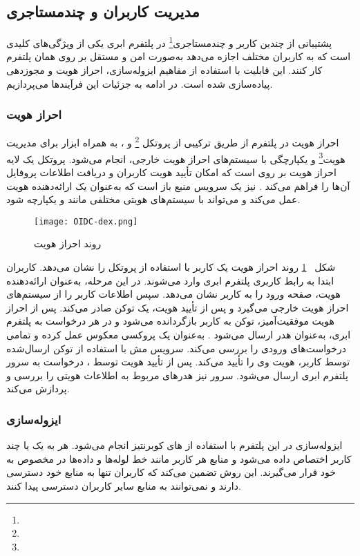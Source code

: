 \subsection{مدیریت کاربران و چندمستاجری}
پشتیبانی از چندین کاربر و چندمستاجری\footnote{} در پلتفرم ابری یکی از ویژگی‌های کلیدی است که به کاربران مختلف اجازه می‌دهد به‌صورت امن و مستقل بر روی همان پلتفرم کار کنند. این قابلیت با استفاده از مفاهیم ایزوله‌سازی، احراز هویت و مجوزدهی پیاده‌سازی شده است. در ادامه به جزئیات این فرآیندها می‌پردازیم.

\subsubsection{احراز هویت}
احراز هویت در پلتفرم از طریق ترکیبی از پروتکل \footnote{} و ، به همراه ابزار  برای مدیریت هویت\footnote{} و یکپارچگی با سیستم‌های احراز هویت خارجی، انجام می‌شود. پروتکل  یک لایه احراز هویت بر روی  است که امکان تأیید هویت کاربران و دریافت اطلاعات پروفایل آن‌ها را فراهم می‌کند \cite{OIDC1}.  نیز یک سرویس منبع باز است که به‌عنوان یک ارائه‌دهنده هویت  عمل می‌کند و می‌تواند با سیستم‌های هویتی مختلفی مانند  و  یکپارچه شود.

\begin{figure}[t]
	\centering
	\texttt{[image: OIDC-dex.png]}
	\caption{روند احراز هویت}
	\label{fig: auth flow}
\end{figure}

شکل 
~\ref{fig: auth flow}
روند احراز هویت یک کاربر با استفاده از پروتکل  را نشان می‌دهد. کاربران ابتدا به رابط کاربری پلتفرم ابری وارد می‌شوند. در این مرحله،  به‌عنوان ارائه‌دهنده هویت، صفحه ورود را به کاربر نشان می‌دهد. سپس  اطلاعات کاربر را از سیستم‌های احراز هویت خارجی می‌گیرد و پس از تأیید هویت، یک توکن  صادر می‌کند. پس از احراز هویت موفقیت‌آمیز، توکن  به کاربر بازگردانده می‌شود و در هر درخواست  به پلتفرم ابری، به‌عنوان هدر  ارسال می‌شود \cite{OIDC1}.  به‌عنوان یک پروکسی معکوس عمل کرده و تمامی درخواست‌های ورودی را بررسی می‌کند. سرویس مش با استفاده از توکن  ارسال‌شده توسط کاربر، هویت وی را تأیید می‌کند. پس از تأیید هویت توسط ، درخواست به سرور  پلتفرم ابری ارسال می‌شود. سرور  نیز هدرهای مربوط به اطلاعات هویتی را بررسی و پردازش می‌کند.

\subsubsection{ایزوله‌سازی}
ایزوله‌سازی در این پلتفرم با استفاده از های کوبرنتیز انجام می‌شود. هر  به یک یا چند کاربر اختصاص داده می‌شود و منابع هر کاربر مانند خط لوله‌ها و داده‌ها در  مخصوص به خود قرار می‌گیرند. این روش تضمین می‌کند که کاربران تنها به منابع خود دسترسی دارند و نمی‌توانند به منابع سایر کاربران دسترسی پیدا کنند.

